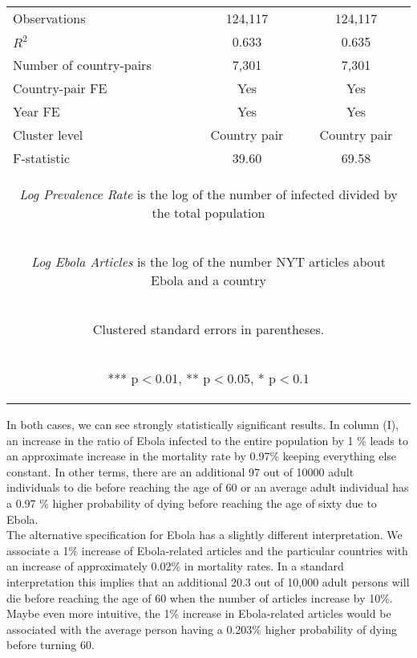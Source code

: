 \documentclass{article}
\begin{document}
\begin{center}
\begin{table}[htbp]
\begin{tabular}{lcc}
Observations & 124,117 & 124,117 \\
$R^2$ & 0.633 & 0.635 \\
Number of country-pairs & 7,301 & 7,301 \\
Country-pair FE & Yes & Yes \\
Year FE & Yes & Yes \\
Cluster level & Country pair & Country pair \\
F-statistic & 39.60 & 69.58 \\ \hline
\multicolumn{3}{c}{\begin{footnotesize} \textit{Log Prevalence Rate} is the log of the number of infected divided by the total population \end{footnotesize} }\\
\multicolumn{3}{c}{\begin{footnotesize} \textit{Log Ebola Articles} is the log of the number NYT articles about Ebola and a country \end{footnotesize} }\\
\multicolumn{3}{c}{\begin{footnotesize} Clustered standard errors in parentheses. \end{footnotesize} }\\
\multicolumn{3}{c}{\begin{footnotesize} *** p$<$0.01, ** p$<$0.05, * p$<$0.1\end{footnotesize}} \\
\end{tabular}
\end{table}
\end{center}
In both cases, we can see strongly statistically significant results. In column (I), an increase in the ratio of Ebola infected to the entire population by 1 \% leads to an approximate increase in the mortality rate by 0.97\% keeping everything else constant. In other terms, there are an additional 97 out of 10000 adult individuals to die before reaching the age of 60 or an average adult individual has a 0.97 \% higher probability of dying before reaching the age of sixty due to Ebola. \\
The alternative specification for Ebola has a slightly different interpretation. We associate a 1\% increase of Ebola-related articles and the particular countries with an increase of approximately 0.02\% in mortality rates. In a standard interpretation this implies that an additional 20.3 out of 10,000 adult persons will die before reaching the age of 60 when the number of articles increase by 10\%. Maybe even more intuitive, the 1\% increase in Ebola-related articles would be associated with the average person having a 0.203\% higher probability of dying before turning 60. \\
\end{document}
